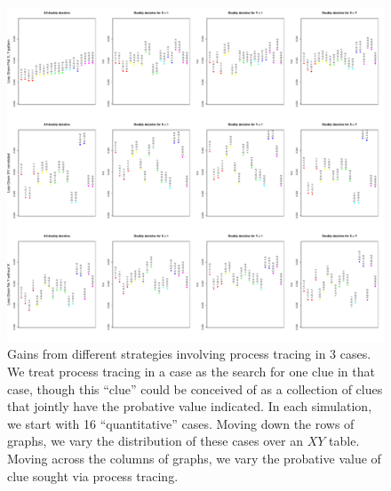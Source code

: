 \documentclass[12pt,]{book}
\begin{document}
\begin{figure}
\centering
\includegraphics{Figures/K3.pdf}
\caption{Gains from different strategies involving process tracing in 3 cases. We treat process tracing in a case as the search for one clue in that case, though this ``clue'' could be conceived of as a collection of clues that jointly have the probative value indicated. In each simulation, we start with 16 ``quantitative'' cases. Moving down the rows of graphs, we vary the distribution of these cases over an \(XY\) table. Moving across the columns of graphs, we vary the probative value of clue sought via process tracing.}
\end{figure}
\end{document}
